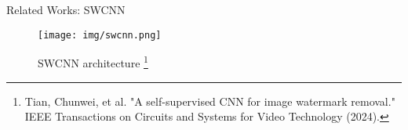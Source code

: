 \begin{frame}{Related Works: SWCNN}
    \begin{figure}
        \centering
        \texttt{[image: img/swcnn.png]}
        \caption{SWCNN architecture \footnote{Tian, Chunwei, et al. "A self-supervised CNN for image watermark removal." IEEE Transactions on Circuits and Systems for Video Technology (2024).}}
    \end{figure}
\end{frame}



